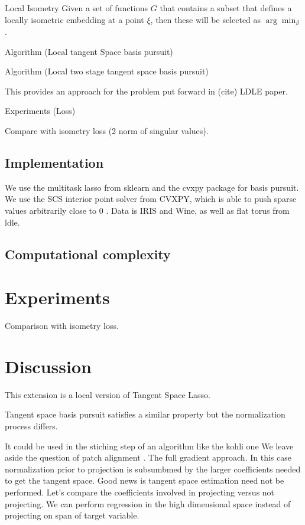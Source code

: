 \documentclass[a4paper,11pt]{article}
\begin{document}
\begin{proposition}{Local Isometry}
Given a set of functions $G$ that contains a subset that defines a locally isometric embedding at a point $\xi$, then these will be selected as $\arg \min_\beta$.
\end{proposition}

Algorithm (Local tangent Space basis pursuit)

Algorithm (Local two stage tangent space basis pursuit)

This provides an approach for the problem put forward in (cite) LDLE paper.

Experiments (Loss)

Compare with isometry loss (2 norm of singular values).

\subsection{Implementation}

We use the multitask lasso from sklearn and the cvxpy package for basis pursuit.  We use the SCS interior point solver from CVXPY, which is able to push sparse values arbitrarily close to 0 \cite{cvxpy_sparse_solution}. Data is IRIS and Wine, as well as flat torus from ldle.
\subsection{Computational complexity}
\section{Experiments}

Comparison with isometry loss.

\section{Discussion}
\label{sec:discussion}

This extension is a local version of Tangent Space Lasso.

Tangent space basis pursuit satisfies a similar property \cite{Koelle2022-lp} but the normalization process differs.

It could be used in the stiching step of an algorithm like the kohli one
We leave aside the question of patch alignment \cite{https://arxiv.org/pdf/2303.11620.pdf, LDLE paper}.
The full gradient approach.
In this case normalization prior to projection is subsumbmed by the larger coefficients needed to get the tangent space.
Good news is tangent space estimation need not be performed.
Let's compare the coefficients involved in projecting versus not projecting.
We can perform regression in the high dimensional space instead of projecting on span of target variable.
\end{document}
